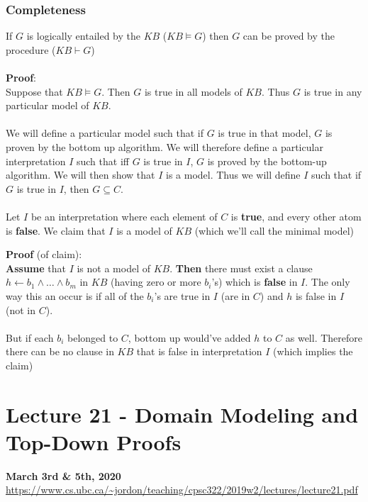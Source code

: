 \documentclass{article}
\def\blu#1{{\color{blu}#1}}
\begin{document}
\subsubsection*{Completeness}
If $ G $ is logically entailed by the $ KB $ ($ KB \vDash G $) then $ G $ can be proved by the procedure ($ KB \vdash G $)\\
\\
\textbf{Proof}:\\
Suppose that $ KB \vDash G $. Then $ G $ is true in all models of $ KB $. Thus $ G $ is true in any particular model of $ KB $. \\
\\
We will define a particular model such that if $ G $ is true in that model, $ G $ is proven by the bottom up algorithm. We will therefore define a particular interpretation $ I $ such that iff $ G $ is true in $ I $, $ G $ is proved by the bottom-up algorithm. We will then show that $ I $ is a model. Thus we will define $ I $ such that if $ G $ is true in $ I $, then $ G \subseteq C $.\\
\\
Let $ I $ be an interpretation where each element of $ C $ is \blu{\textbf{true}}, and every other atom is \blu{\textbf{false}}. We claim that $ I $ is a model of $ KB $ (which we'll call the minimal model)
\begin{siderules}
\textbf{Proof} (of claim):\\
\textbf{Assume} that $ I $ is not a model of $ KB $. \textbf{Then} there must exist a clause $ h \leftarrow b_1 \land \dots \land b_m $ in $ KB $ (having zero or more $ b_i $'s) which is \textbf{false} in $ I $. The only way this an occur is if all of the $ b_i $'s are true in $ I $ (are in $ C $) and $ h $ is false in $ I $ (not in $ C $).\\
\\
But if each $ b_i $ belonged to $ C $, bottom up would've added $ h $ to $ C $ as well. Therefore there can be no clause in $ KB $ that is false in interpretation $ I $ (which implies the claim)
\end{siderules}



\newpage
\section*{Lecture 21 - Domain Modeling and Top-Down Proofs}
\textbf{March 3rd \& 5th, 2020}\\
\url{https://www.cs.ubc.ca/~jordon/teaching/cpsc322/2019w2/lectures/lecture21.pdf}
\end{document}
